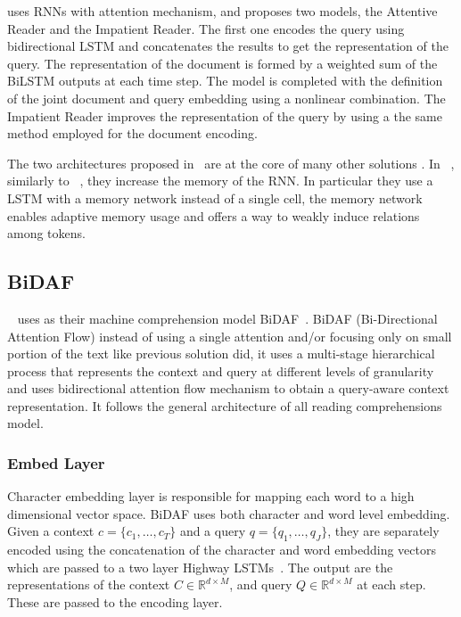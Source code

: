 \cite{hermann2015teaching} uses RNNs with attention mechanism, and proposes two models, the Attentive Reader and the Impatient Reader. The first one encodes the query using bidirectional LSTM and concatenates the results to get the representation of the query. The representation of the document is formed by a weighted sum of the BiLSTM outputs at each time step. The model is completed with the definition of the joint document and query embedding using a nonlinear combination. The Impatient Reader improves the representation of the query by using a the same method employed for the document encoding. 

The two architectures proposed in~\citep{hermann2015teaching} are at the core of many other solutions \citep{kadlec-etal-2016-text, chen-etal-2016-thorough}. In ~\citep{cheng-etal-2016-long}, similarly to ~\citep{weston2015memory}, they increase the memory of the RNN. In particular they use a LSTM with a memory network instead of a single cell, the memory network enables adaptive memory usage and offers a way to weakly induce relations among tokens.



\subsection{BiDAF}
\label{sec:bidaf}
~\cite{levy2017zero} uses as their machine comprehension model BiDAF~\citep{seo2016bidirectional}. BiDAF (Bi-Directional Attention Flow) instead of using a single attention and/or focusing only on small portion of the text like previous solution did, it uses a multi-stage hierarchical process that represents the context and query at different levels of granularity and uses bidirectional attention flow mechanism to obtain a query-aware context representation. It follows the general architecture of all reading comprehensions model.

\subsubsection{Embed Layer}
Character embedding layer is responsible for mapping each word to a high dimensional vector space. BiDAF uses both character and word level embedding. Given a context $c =\{c_1, \dots, c_T\}$ and a query $q = \{q_1, \dots, q_J\}$, they are separately encoded using the concatenation of the character and word embedding vectors which are passed to a two layer Highway LSTMs~\citep{SrivastavaGS15highway}. The output are the representations of the context $C \in \mathbb{R}^{d\times M}$, and query $Q \in \mathbb{R}^{d\times M}$ at each step. These are passed to the encoding layer.

